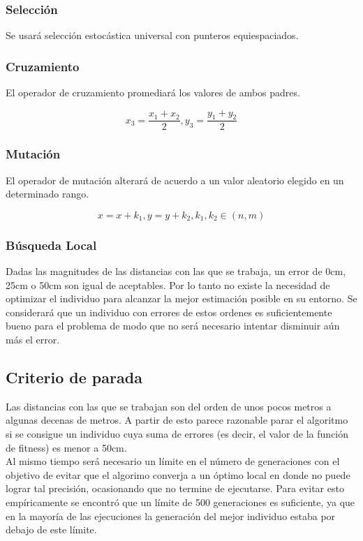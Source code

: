 \documentclass[journal]{IEEEtran}
\begin{document}
\subsubsection{Selección}

Se usará selección estocástica universal con punteros equiespaciados.\\

\subsubsection{Cruzamiento}

El operador de cruzamiento promediará los valores de ambos padres.

$$x_3 = \frac {x_1 + x_2} {2}, y_3 = \frac {y_1 + y_2} {2}$$

\subsubsection{Mutación}

El operador de mutación alterará de acuerdo a un valor aleatorio elegido en un determinado rango.

$$x = x + k_1, y = y + k_2, k_1, k_2 \in (n,m)$$

\subsubsection{Búsqueda Local}

Dadas las magnitudes de las distancias con las que se trabaja, un error de 0cm, 25cm o 50cm son igual de aceptables. Por lo tanto no existe la necesidad de optimizar el individuo para alcanzar la mejor estimación posible en su entorno. Se considerará que un individuo con errores de estos ordenes es suficientemente bueno para el problema de modo que no será necesario intentar disminuir aún más el error.\\

\subsection{Criterio de parada}

Las distancias con las que se trabajan son del orden de unos pocos metros a algunas decenas de metros. A partir de esto parece razonable parar el algoritmo si se consigue un individuo cuya suma de errores (es decir, el valor de la función de fitness) es menor a 50cm.\\

Al mismo tiempo será necesario un límite en el número de generaciones con el objetivo de evitar que el algorimo converja a un óptimo local en donde no puede lograr tal precisión, ocasionando que no termine de ejecutarse. Para evitar esto empíricamente se encontró que un límite de 500 generaciones es suficiente, ya que en la mayoría de las ejecuciones la generación del mejor individuo estaba por debajo de este límite.\\
\end{document}
